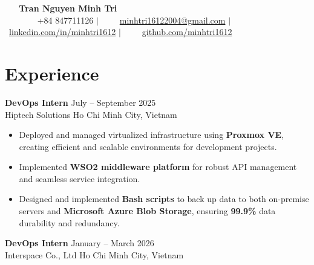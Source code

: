 \documentclass[a4paper,10pt]{article} %
\newcommand{\resumeItemListStart}{\begin{justify}\begin{itemize}[leftmargin=3ex, rightmargin=2ex, noitemsep,labelsep=1.2mm,itemsep=0mm,topsep=0pt,partopsep=0pt]\small}
\newcommand{\resumeItemListEnd}{\end{itemize}\end{justify}\vspace{-3mm}} %
\begin{document}
\begin{center}
    {\Huge \textbf{Tran Nguyen Minh Tri}} \\[6pt]
    \small
    \faPhone\ +84 847711126 \hspace{0.5em} $|$ \hspace{0.5em}
    \faEnvelope\ \href{mailto:minhtri16122004@gmail.com}{minhtri16122004@gmail.com} \hspace{0.5em} $|$ \hspace{0.5em}
    \faLinkedin\ \href{https://www.linkedin.com/in/tr%C3%AD-tr%E1%BA%A7n-1a0ab2265/}{linkedin.com/in/minhtri1612} \hspace{0.5em} $|$ \hspace{0.5em}
    \faGithub\ \href{https://github.com/minhtri1612}{github.com/minhtri1612}
\end{center}




\section*{Experience}

\textbf{DevOps Intern} \hfill July -- September 2025  \\
Hiptech Solutions \hfill Ho Chi Minh City, Vietnam

\vspace{-3.5mm}

\resumeItemListStart
  \item[--] Deployed and managed virtualized infrastructure using \textbf{Proxmox VE}, creating efficient and scalable environments for development projects.
  \item[--] Implemented \textbf{WSO2 middleware platform} for robust API management and seamless service integration.
  \item[--] Designed and implemented \textbf{Bash scripts} to back up data to both on-premise servers and \textbf{Microsoft Azure Blob Storage}, ensuring \textbf{99.9\%} data durability and redundancy.
\resumeItemListEnd
\vspace{+1.5mm}




\textbf{DevOps Intern} \hfill January -- March 2026   \\
Interspace Co., Ltd \hfill Ho Chi Minh City, Vietnam

\vspace{-3.5mm}
\end{document}
